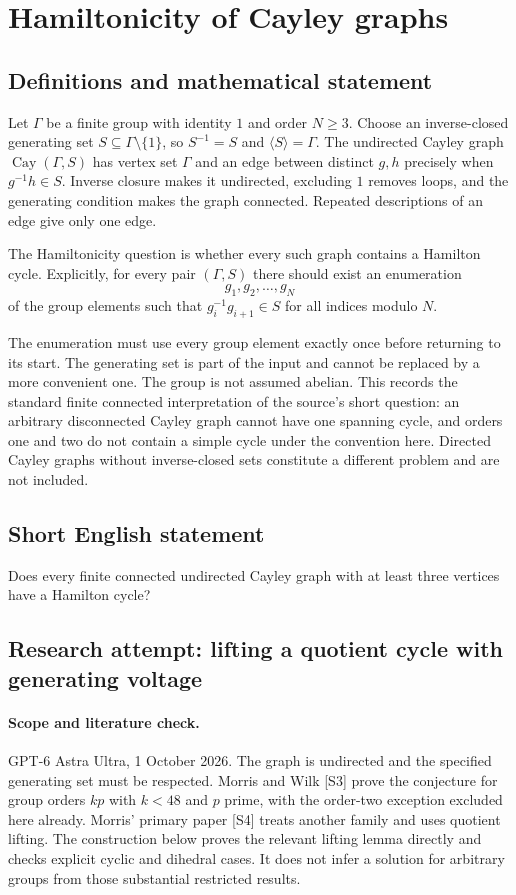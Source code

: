 \documentclass[11pt,a4paper]{article}
\begin{document}
\section*{Hamiltonicity of Cayley graphs}\label{statement}

\subsection{Definitions and mathematical statement}
Let $\Gamma$ be a finite group with identity $1$ and order
$N\geq3$. Choose an inverse-closed generating set
$S\subseteq\Gamma\setminus\{1\}$, so $S^{-1}=S$ and
$\langle S\rangle=\Gamma$. The undirected Cayley graph
$\operatorname{Cay}(\Gamma,S)$ has vertex set $\Gamma$ and
an edge between distinct $g,h$ precisely when
$g^{-1}h\in S$. Inverse closure makes it undirected,
excluding $1$ removes loops, and the generating condition
makes the graph connected. Repeated descriptions of an edge
give only one edge.

The Hamiltonicity question is whether every such graph
contains a Hamilton cycle. Explicitly, for every pair
$(\Gamma,S)$ there should exist an enumeration
\[
 g_1,g_2,\ldots,g_N
\]
of the group elements such that $g_i^{-1}g_{i+1}\in S$
for all indices modulo $N$.

The enumeration must use every group element exactly once
before returning to its start. The generating set is part
of the input and cannot be replaced by a more convenient
one. The group is not assumed abelian. This records the
standard finite connected interpretation of the source's
short question: an arbitrary disconnected Cayley graph
cannot have one spanning cycle, and orders one and two
do not contain a simple cycle under the convention here.
Directed Cayley graphs without inverse-closed sets constitute
a different problem and are not included.
\subsection{Short English statement}
Does every finite connected undirected Cayley graph with at least three vertices have a Hamilton cycle?
\subsection{Research attempt: lifting a quotient cycle with generating voltage}
\paragraph{Scope and literature check.}
GPT-6 Astra Ultra, 1 October 2026. The graph is undirected and the
specified generating set must be respected. Morris and Wilk [S3]
prove the conjecture for group orders $kp$ with $k<48$ and $p$
prime, with the order-two exception excluded here already. Morris'
primary paper [S4] treats another family and uses quotient lifting.
The construction below proves the relevant lifting lemma directly and
checks explicit cyclic and dihedral cases. It does not infer a
solution for arbitrary groups from those substantial restricted results.
\end{document}
